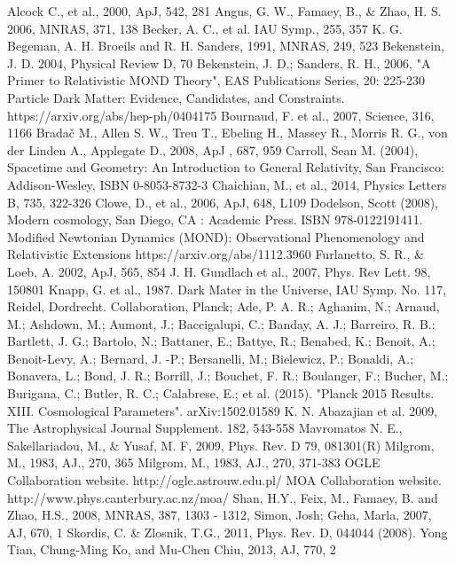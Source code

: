 \documentclass[12pt]{article}
\begin{document}
\begin{thebibliography}{99}
Alcock C., et al., 2000, ApJ, 542, 281
Angus, G. W., Famaey, B., \& Zhao, H. S. 2006, MNRAS, 371, 138
Becker, A. C., et al. IAU Symp., 255, 357
 K. G. Begeman, A. H. Broeils and R. H. Sanders, 1991, MNRAS, 249, 523
 Bekenstein, J. D. 2004, Physical Review D, 70 
Bekenstein, J. D.; Sanders, R. H., 2006, "A Primer to Relativistic MOND Theory", EAS Publications Series, 20: 225-230
 Particle Dark Matter: Evidence, Candidates, and Constraints. https://arxiv.org/abs/hep-ph/0404175
Bournaud, F. et al., 2007, Science, 316, 1166
Brada\v{c} M., Allen S. W., Treu T., Ebeling H., Massey R., Morris R. G., von der Linden A., Applegate D., 2008, ApJ , 687, 959
Carroll, Sean M. (2004), Spacetime and Geometry: An Introduction to General Relativity, San Francisco: Addison-Wesley, ISBN 0-8053-8732-3
Chaichian, M., et al., 2014, Physics Letters B, 735, 322-326
Clowe, D., et al., 2006, ApJ, 648, L109
 Dodelson, Scott (2008), Modern cosmology, San Diego, CA : Academic Press. ISBN 978-0122191411.
Modified Newtonian Dynamics (MOND): Observational Phenomenology and Relativistic Extensions https://arxiv.org/abs/1112.3960
Furlanetto, S. R., \& Loeb, A. 2002, ApJ, 565, 854
J. H. Gundlach et al., 2007, Phys. Rev Lett. 98, 150801
Knapp, G. et al., 1987. Dark Mater in the Universe, IAU Symp. No. 117, Reidel, Dordrecht.
 Collaboration, Planck; Ade, P. A. R.; Aghanim, N.; Arnaud, M.; Ashdown, M.; Aumont, J.; Baccigalupi, C.; Banday, A. J.; Barreiro, R. B.; Bartlett, J. G.; Bartolo, N.; Battaner, E.; Battye, R.; Benabed, K.; Benoit, A.; Benoit-Levy, A.; Bernard, J. -P.; Bersanelli, M.; Bielewicz, P.; Bonaldi, A.; Bonavera, L.; Bond, J. R.; Borrill, J.; Bouchet, F. R.; Boulanger, F.; Bucher, M.; Burigana, C.; Butler, R. C.; Calabrese, E.; et al. (2015). "Planck 2015 Results. XIII. Cosmological Parameters". arXiv:1502.01589
 K. N. Abazajian et al. 2009,  The Astrophysical Journal Supplement. 182, 543-558
Mavromatos N. E., Sakellariadou, M., \& Yusaf, M. F, 2009, Phys. Rev. D 79, 081301(R)
  Milgrom, M.,  1983, AJ., 270, 365
  Milgrom, M., 1983, AJ., 270, 371-383
OGLE Collaboration website. http://ogle.astrouw.edu.pl/
MOA Collaboration website. http://www.phys.canterbury.ac.nz/moa/
Shan, H.Y., Feix, M., Famaey, B. and Zhao, H.S., 2008, MNRAS, 387, 1303 - 1312,
Simon, Josh; Geha, Marla, 2007, AJ, 670, 1
Skordis, C. \& Zlosnik, T.G., 2011, Phys. Rev. D, 044044
(2008).
Yong Tian, Chung-Ming Ko, and Mu-Chen Chiu, 2013, AJ, 770, 2
\end{thebibliography}
\end{document}
